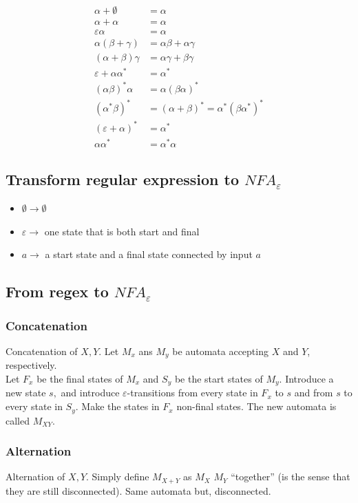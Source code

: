 \documentclass[a4paper]{article}
\begin{document}
\begin{align}
    \alpha+\emptyset &= \alpha\\
    \alpha+\alpha&=\alpha\\
    \varepsilon \alpha &= \alpha\\
    \alpha(\beta + \gamma) &= \alpha\beta + \alpha\gamma\\
    (\alpha+\beta)\gamma &= \alpha\gamma + \beta\gamma\\
    \varepsilon + \alpha\alpha^* &= \alpha^*\\
    (\alpha\beta)^*\alpha &= \alpha(\beta\alpha)^*\\
    (\alpha^*\beta)^* &= (\alpha+\beta)^* = \alpha^*(\beta\alpha^*)^*\\
    (\varepsilon+\alpha)^* &= \alpha^*\\
    \alpha\alpha^* &= \alpha^*\alpha
\end{align}
\subsection{Transform regular expression to $NFA_\varepsilon$}
\begin{itemize}
    \item $\emptyset\rightarrow \emptyset$
    \item $\varepsilon \rightarrow $ one state that is both start and final
    \item $a\rightarrow$ a start state and a final state connected by input $a$
\end{itemize}
\subsection{From regex to $NFA_\varepsilon$}
\subsubsection{Concatenation}
Concatenation of $X,Y$. Let $M_x$ ans $M_y$ be automata accepting $X$ and $Y$, respectively.\\
Let $F_x$ be the final states of $M_x$ and $S_y$ be the start states of $M_y$.
Introduce a new state $s,$ and introduce $\varepsilon$-transitions from every
state in $F_x$ to $s$ and from $s$ to every state in $S_y$. Make the states
in $F_x$ non-final states. The new automata is called $M_{XY}$.

\subsubsection{Alternation}
Alternation of $X,Y$. Simply define $M_{X+Y}$ as $M_X$ $M_Y$ ``together''
(is the sense that they are still disconnected). Same automata but, disconnected.
\end{document}
